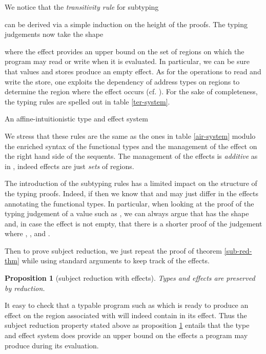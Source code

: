 \documentclass[11pt]{article}
\newtheorem{proposition}[theorem]{Proposition}
\begin{document}
We notice that the {\em transitivity rule} for subtyping

can be derived via a simple induction on the height of the proofs.
The typing judgements now take the shape

where the effect  provides an upper bound on the set of 
regions on which the program  may read or write when it is
evaluated. In particular, we can be sure that values and stores
produce an empty effect. As for the operations to read and write
the store, one exploits the dependency of address types on regions
to determine the region where the effect occurs (cf. \cite{LG88}).
For the sake of completeness, the typing rules are spelled out
in table \ref{ter-system}. 

\begin{table}
{\footnotesize
}
\caption{An affine-intuitionistic type and effect system}\label{ter-system}
\end{table}

We stress that these rules are the same as the ones in table
\ref{air-system} modulo the enriched syntax of the functional types and the
management of the effect  on the right hand side of the 
sequents. The management of the effects is {\em additive} as in
\cite{LG88}, indeed effects are just {\em sets} of regions.

The introduction of the subtyping rules has a limited impact
on the structure of the typing proofs. Indeed, if 
then we know that  and  may just differ in the effects 
annotating the functional types. In particular, when looking at the
proof of the typing judgement of a value such as 
,  we can always argue that 
 has the shape  and, in case the effect 
is not empty, that there is a shorter proof of the judgement
 where
, , and .


Then to prove subject reduction, we just repeat the proof of
theorem \ref{sub-red-thm} while using standard arguments to keep 
track of the effects.

\begin{proposition}[subject reduction with effects]\label{sub-red-eff-thm}
Types and effects are preserved by reduction.
\end{proposition}

It easy to check that a typable program such as  which
is ready to produce an effect on the region  associated with 
will indeed contain  in its effect. Thus the subject reduction
property stated above as proposition \ref{sub-red-eff-thm}
entails that the type and effect system does provide an upper bound on
the effects a program may produce during its evaluation.
\end{document}
